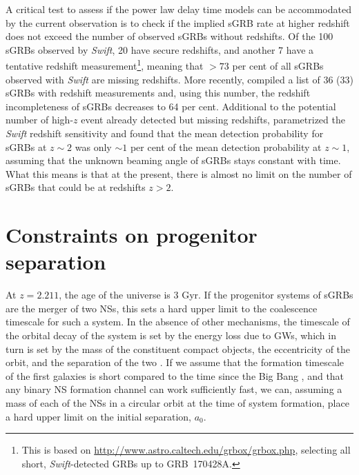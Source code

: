 \documentclass[referee]{aa}
\begin{document}
A critical test to assess if the power law delay time models can be accommodated
by the current observation is to check if the implied sGRB rate at higher
redshift does not exceed the number of observed sGRBs without redshifts. Of the
100  sGRBs observed by \textit{Swift}, 20 have secure redshifts, and another 7
have a tentative redshift measurement\footnote{This is based on
	\url{http://www.astro.caltech.edu/grbox/grbox.php}, selecting all short,
	\textit{Swift}-detected GRBs up to GRB~170428A.}, meaning that $> 73$ per cent
of all sGRBs observed with \textit{Swift} are missing redshifts. More recently,
\citet{Fong2017} \citep{LIGOScientificCollaboration2017b} compiled a list of 36
(33) sGRBs with redshift measurements and, using this number, the redshift
incompleteness of sGRBs decreases to 64 per cent. Additional to the potential
number of high-$z$ event already detected but missing redshifts,
\citet{Behroozi2014} parametrized the \textit{Swift} redshift sensitivity and
found that the mean detection probability for sGRBs at $z \sim2$ was only
$\sim1$ per cent of the mean detection probability at $z \sim1$, assuming that
the unknown beaming angle of sGRBs stays constant with time. What this means is
that at the present, there is almost no limit on the number of sGRBs that could
be at redshifts $z > 2$.

\section{Constraints on progenitor separation}

At $z = 2.211$, the age of the universe is 3 Gyr. If the progenitor systems of
sGRBs are the merger of two NSs, this sets a hard upper limit to the coalescence
timescale for such a system. In the absence of other mechanisms, the timescale
of the orbital decay of the system is set by the energy loss due to
GWs, which in turn is set by the mass of the constituent compact
objects, the eccentricity of the orbit, and the separation of the two
\citep{Postnov2014}. If we assume that the formation timescale of the first
galaxies is short compared to the time since the Big Bang \citep{Richard2011},
and that any binary NS formation channel can work sufficiently fast,
we can, assuming a mass of each of the NSs in a circular orbit at the time of
system formation, place a hard upper limit on the initial separation, $a_0$.
\end{document}

